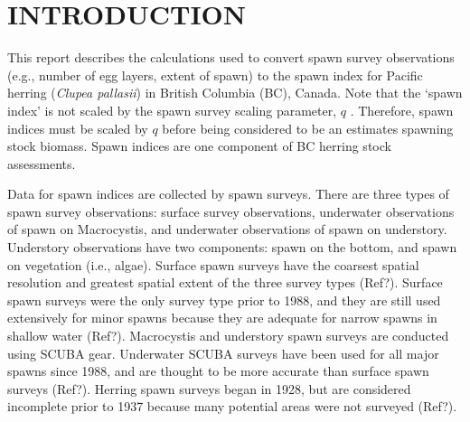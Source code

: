 \documentclass[12pt]{article}
\begin{document}
\renewcommand\listfigurename{LIST OF FIGURES}
\renewcommand\listtablename{LIST OF TABLES}

\renewcommand*{\thefootnote}{\fnsymbol{footnote}}


\tableofcontents \clearpage  %

\thispagestyle{empty}  %
\renewcommand*{\thefootnote}{\arabic{footnote}}  %
\setcounter{footnote}{0}  %


\section{INTRODUCTION}

This report describes the calculations used to convert spawn survey observations (e.g., number of egg layers, extent of spawn) to the spawn index for Pacific herring (\!\emph{Clupea pallasii}) in British Columbia (BC), Canada.
Note that the `spawn index' is not scaled by the spawn survey scaling parameter, $q$ \citeyearpar[CSAS][]{CSAS2015b}.
Therefore, spawn indices must be scaled by $q$ before being considered to be an estimates spawning stock biomass.
Spawn indices are one component of BC herring stock assessments.

Data for spawn indices are collected by spawn surveys.
There are three types of spawn survey observations: surface survey observations, underwater observations of spawn on Macrocystis, and underwater observations of spawn on understory.
Understory observations have two components: spawn on the bottom, and spawn on vegetation (i.e., algae).
Surface spawn surveys have the coarsest spatial resolution and greatest spatial extent of the three survey types (Ref?).
Surface spawn surveys were the only survey type prior to 1988, and they are still used extensively for minor spawns because they are adequate for narrow spawns in shallow water (Ref?).
Macrocystis and understory spawn surveys are conducted using SCUBA gear.
Underwater SCUBA surveys have been used for all major spawns since 1988, and are thought to be more accurate than surface spawn surveys (Ref?).
Herring spawn surveys began in 1928, but are considered incomplete prior to 1937 because many potential areas were not surveyed (Ref?).
\end{document}
